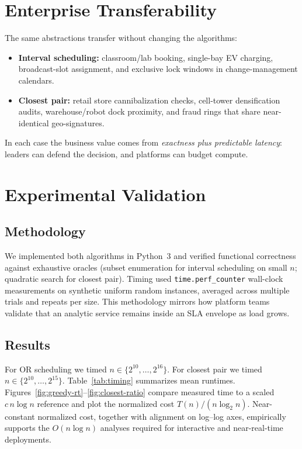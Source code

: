 \documentclass[sigconf,review=false]{acmart}
\theoremstyle{definition}
\begin{document}
\section{Enterprise Transferability}
\label{sec:transfer}

The same abstractions transfer without changing the algorithms:
\begin{itemize}
  \item \textbf{Interval scheduling:} classroom/lab booking, single-bay EV
        charging, broadcast-slot assignment, and exclusive lock windows in
        change-management calendars.
  \item \textbf{Closest pair:} retail store cannibalization checks, cell-tower
        densification audits, warehouse/robot dock proximity, and fraud rings
        that share near-identical geo-signatures.
\end{itemize}
In each case the business value comes from \emph{exactness plus predictable
latency}: leaders can defend the decision, and platforms can budget compute.

\section{Experimental Validation}
\label{sec:exp}

\subsection{Methodology}
We implemented both algorithms in Python~3 and verified functional
correctness against exhaustive oracles (subset enumeration for interval
scheduling on small $n$; quadratic search for closest pair). Timing used
\texttt{time.perf\_counter} wall-clock measurements on synthetic uniform
random instances, averaged across multiple trials and repeats per size.
This methodology mirrors how platform teams validate that an analytic
service remains inside an SLA envelope as load grows.

\subsection{Results}
For OR scheduling we timed $n\in\{2^{10},\ldots,2^{16}\}$. For closest pair
we timed $n\in\{2^{10},\ldots,2^{15}\}$. Table~\ref{tab:timing} summarizes
mean runtimes. Figures~\ref{fig:greedy-rt}--\ref{fig:closest-ratio} compare
measured time to a scaled $c\,n\log n$ reference and plot the normalized
cost $T(n)/(n\log_2 n)$. Near-constant normalized cost, together with
alignment on log--log axes, empirically supports the $O(n\log n)$ analyses
required for interactive and near-real-time deployments.
\end{document}
